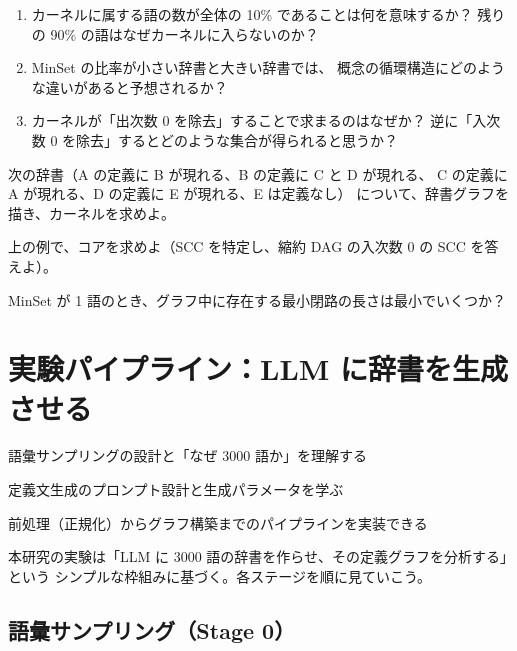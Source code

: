 \documentclass[lang=jp, color=black, mode=simple, 11pt]{elegantbook}
\begin{document}
\begin{reflect}
\begin{enumerate}
  \item カーネルに属する語の数が全体の 10\% であることは何を意味するか？
        残りの 90\% の語はなぜカーネルに入らないのか？
  \item MinSet の比率が小さい辞書と大きい辞書では、
        概念の循環構造にどのような違いがあると予想されるか？
  \item カーネルが「出次数 0 を除去」することで求まるのはなぜか？
        逆に「入次数 0 を除去」するとどのような集合が得られると思うか？
\end{enumerate}
\end{reflect}

\begin{problemset}[第 1 章の確認問題]
  \item 次の辞書（A の定義に B が現れる、B の定義に C と D が現れる、
        C の定義に A が現れる、D の定義に E が現れる、E は定義なし）
        について、辞書グラフを描き、カーネルを求めよ。
  \item 上の例で、コアを求めよ（SCC を特定し、縮約 DAG の入次数 0 の SCC を答えよ）。
  \item MinSet が 1 語のとき、グラフ中に存在する最小閉路の長さは最小でいくつか？
\end{problemset}

\chapter{実験パイプライン：LLM に辞書を生成させる}

\begin{introduction}[この章で学ぶこと]
  \item 語彙サンプリングの設計と「なぜ 3000 語か」を理解する
  \item 定義文生成のプロンプト設計と生成パラメータを学ぶ
  \item 前処理（正規化）からグラフ構築までのパイプラインを実装できる
\end{introduction}

本研究の実験は「LLM に 3000 語の辞書を作らせ、その定義グラフを分析する」という
シンプルな枠組みに基づく。各ステージを順に見ていこう。

\section{語彙サンプリング（Stage 0）}
\end{document}
